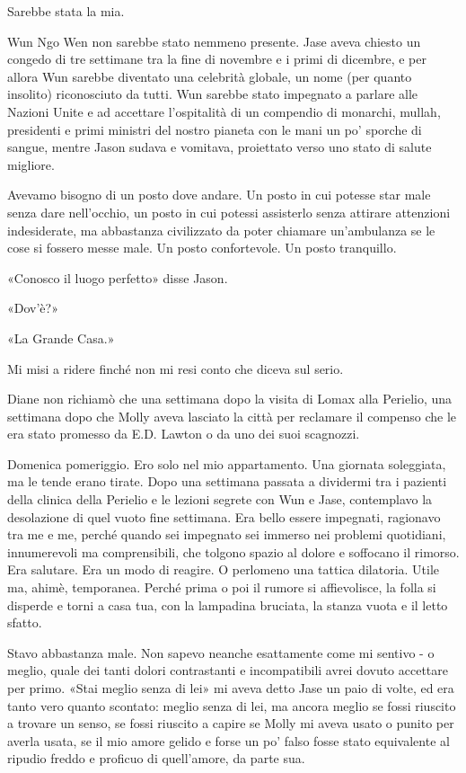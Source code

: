 Sarebbe stata la mia.

Wun Ngo Wen non sarebbe stato nemmeno presente. Jase aveva chiesto un
congedo di tre settimane tra la fine di novembre e i primi di dicembre,
e per allora Wun sarebbe diventato una celebrità globale, un nome (per
quanto insolito) riconosciuto da tutti. Wun sarebbe stato impegnato a
parlare alle Nazioni Unite e ad accettare l'ospitalità di un compendio
di monarchi, mullah, presidenti e primi ministri del nostro pianeta con
le mani un po' sporche di sangue, mentre Jason sudava e vomitava,
proiettato verso uno stato di salute migliore.

Avevamo bisogno di un posto dove andare. Un posto in cui potesse star
male senza dare nell'occhio, un posto in cui potessi assisterlo senza
attirare attenzioni indesiderate, ma abbastanza civilizzato da poter
chiamare un'ambulanza se le cose si fossero messe male. Un posto
confortevole. Un posto tranquillo.

«Conosco il luogo perfetto» disse Jason.

«Dov'è?»

«La Grande Casa.»

Mi misi a ridere finché non mi resi conto che diceva sul serio.

\separatorefiori

Diane non richiamò che una settimana dopo la visita di Lomax alla
Perielio, una settimana dopo che Molly aveva lasciato la città per
reclamare il compenso che le era stato promesso da E.D. Lawton o da uno
dei suoi scagnozzi.

Domenica pomeriggio. Ero solo nel mio appartamento. Una giornata
soleggiata, ma le tende erano tirate. Dopo una settimana passata a
dividermi tra i pazienti della clinica della Perielio e le lezioni
segrete con Wun e Jase, contemplavo la desolazione di quel vuoto fine
settimana. Era bello essere impegnati, ragionavo tra me e me, perché
quando sei impegnato sei immerso nei problemi quotidiani, innumerevoli
ma comprensibili, che tolgono spazio al dolore e soffocano il rimorso.
Era salutare. Era un modo di reagire. O perlomeno una tattica dilatoria.
Utile ma, ahimè, temporanea. Perché prima o poi il rumore si
affievolisce, la folla si disperde e torni a casa tua, con la lampadina
bruciata, la stanza vuota e il letto sfatto.

Stavo abbastanza male. Non sapevo neanche esattamente come mi sentivo -
o meglio, quale dei tanti dolori contrastanti e incompatibili avrei
dovuto accettare per primo. «Stai meglio senza di lei» mi aveva detto
Jase un paio di volte, ed era tanto vero quanto scontato: meglio senza
di lei, ma ancora meglio se fossi riuscito a trovare un senso, se fossi
riuscito a capire se Molly mi aveva usato o punito per averla usata, se
il mio amore gelido e forse un po' falso fosse stato equivalente al
ripudio freddo e proficuo di quell'amore, da parte sua.

